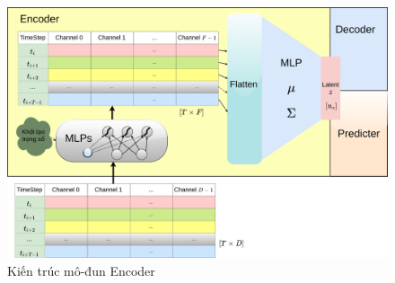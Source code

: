 \begin{figure}[H]
	\center	\includegraphics[width=1.0\textwidth]{figures/VAE/pngs/VAE_Encoder.png}
	\caption{Kiến trúc mô-đun Encoder}
	\label{fig:VAE-encoder}

\end{figure}